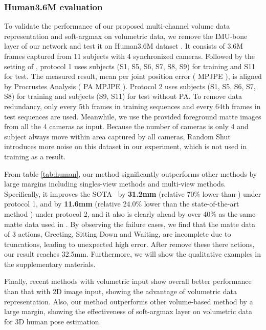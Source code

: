 \documentclass[10pt,twocolumn,letterpaper]{article}
\begin{document}
\subsubsection{Human3.6M evaluation}
\label{sec:human_36}
\vspace*{-4pt}
 To validate the performance of our proposed multi-channel volume data representation and soft-argmax on volumetric data, we remove the IMU-bone layer of our network and test it on Human3.6M dataset \cite{h36m_pami}. It consists of 3.6M frames captured from 11 subjects with 4 synchronized cameras. Followed by the setting of \cite{sun2018integral}, protocol 1 uses subjects (S1, S5, S6, S7, S8, S9) for training and S11 for test. The measured result, mean per joint position error ( MPJPE ), is aligned by Procrustes Analysis ( PA MPJPE ). Protocol 2 uses subjects (S1, S5, S6, S7, S8) for training and subjects (S9, S11) for test without PA. To remove data redundancy, only every 5th frames in training sequences and every 64th frames in test sequences are used. Meanwhile, we use the provided foreground matte images from all the 4 cameras as input. Because the number of cameras is only 4 and subject always move within area captured by all cameras, Random Shut introduces more noise on this dataset in our experiment, which is not used in training as a result.


From table \ref{tab:human}, our method significantly outperforms other methods by large margins including singles-view methods and multi-view methods. Specifically, it improves the SOTA~\cite{tome2018rethinking} by \textbf{31.2mm} (relative 70\% lower than \cite{tome2018rethinking}) under protocol 1, and by \textbf{11.6mm} (relative 24.0\% lower than the state-of-the-art method \cite{kocabas2019self}) under protocol 2, and it also is clearly ahead by over
40\% as the same matte data used in \cite{trumble2018deep}.
By observing the failure cases, we find that the matte data of 3 actions, Greeting, Sitting Down and Waiting, are incomplete due to truncations, leading to unexpected high error. After remove these there actions, our result reaches 32.5mm. Furthermore, we will show the qualitative examples in the supplementary materials.

Finally, recent methods with volumetric input show overall better performance than that with 2D image input, showing the advantage of volumetric data representation. Also, our method outperforms other volume-based method by a large margin, showing the effectiveness of soft-argmax layer on volumetric data for 3D human pose estimation. 
\end{document}
